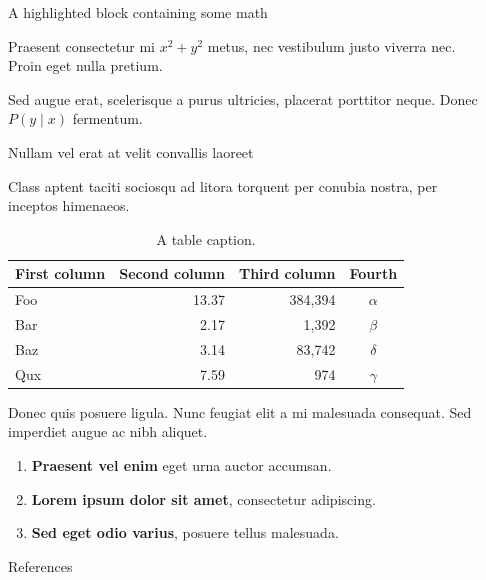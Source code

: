 \documentclass[final]{beamer}
\newlength{\sepwidth}
\newlength{\colwidth}
\newcommand{\separatorcolumn}{\begin{column}{\sepwidth}\end{column}}
\begin{document}
\begin{frame}[t]
\begin{columns}[t]
\begin{column}{\colwidth}
\begin{blueblock}{A highlighted block containing some math}

    Praesent consectetur mi $x^2 + y^2$ metus, nec vestibulum justo viverra
    nec. Proin eget nulla pretium.


    Sed augue erat, scelerisque a purus ultricies, placerat porttitor neque.
    Donec $P(y \mid x)$ fermentum.

  \end{blueblock}

  \begin{block}{Nullam vel erat at velit convallis laoreet}

    Class aptent taciti sociosqu ad litora torquent per conubia nostra, per
    inceptos himenaeos.

    \begin{table}
      \centering
      \caption{A table caption.}
      \begin{tabular}{l r r c}
        \toprule
        \textbf{First column} & \textbf{Second column} & \textbf{Third column} & \textbf{Fourth} \\
        \midrule
        Foo & 13.37 & 384,394 & $\alpha$ \\
        Bar & 2.17 & 1,392 & $\beta$ \\
        Baz & 3.14 & 83,742 & $\delta$ \\
        Qux & 7.59 & 974 & $\gamma$ \\
        \bottomrule
      \end{tabular}
    \end{table}

    Donec quis posuere ligula. Nunc feugiat elit a mi malesuada consequat. Sed
    imperdiet augue ac nibh aliquet.

    \begin{enumerate}
      \item \textbf{Praesent vel enim} eget urna auctor accumsan.
      \item \textbf{Lorem ipsum dolor sit amet}, consectetur adipiscing.
      \item \textbf{Sed eget odio varius}, posuere tellus malesuada.
    \end{enumerate}

  \end{block}

  \begin{block}{References}

    \nocite{*}
    \footnotesize{}

  \end{block}

\end{column}

\separatorcolumn
\end{columns}
\end{frame}
\end{document}
